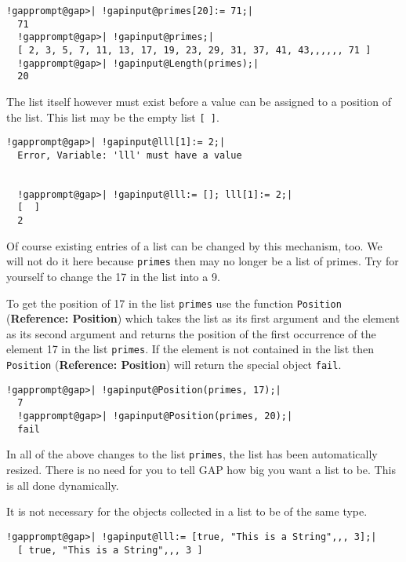 \documentclass[a4paper,11pt]{report}
\begin{document}
{{ 
\begin{Verbatim}[commandchars=!@|,fontsize=\small,frame=single,label=Example]
  !gapprompt@gap>| !gapinput@primes[20]:= 71;|
  71
  !gapprompt@gap>| !gapinput@primes;|
  [ 2, 3, 5, 7, 11, 13, 17, 19, 23, 29, 31, 37, 41, 43,,,,,, 71 ]
  !gapprompt@gap>| !gapinput@Length(primes);|
  20
\end{Verbatim}
 

 The list itself however must exist before a value can be assigned to a
position of the list. This list may be the empty list \texttt{[ ]}. 

 
\begin{Verbatim}[commandchars=!@|,fontsize=\small,frame=single,label=Example]
  !gapprompt@gap>| !gapinput@lll[1]:= 2;|
  Error, Variable: 'lll' must have a value
  
  
  !gapprompt@gap>| !gapinput@lll:= []; lll[1]:= 2;|
  [  ]
  2
\end{Verbatim}
 

 Of course existing entries of a list can be changed by this mechanism, too. We
will not do it here because \texttt{primes} then may no longer be a list of primes. Try for yourself to change the 17 in
the list into a 9. 

 To get the position of 17 in the list \texttt{primes} use the function \texttt{Position} (\textbf{Reference: Position}) which takes the list as its first argument and the element as its second
argument and returns the position of the first occurrence of the element 17 in
the list \texttt{primes}. If the element is not contained in the list then \texttt{Position} (\textbf{Reference: Position}) will return the special object \texttt{fail}. 

 
\begin{Verbatim}[commandchars=!@|,fontsize=\small,frame=single,label=Example]
  !gapprompt@gap>| !gapinput@Position(primes, 17);|
  7
  !gapprompt@gap>| !gapinput@Position(primes, 20);|
  fail
\end{Verbatim}
 

 In all of the above changes to the list \texttt{primes}, the list has been automatically resized. There is no need for you to tell \textsf{GAP} how big you want a list to be. This is all done dynamically. 

 It is not necessary for the objects collected in a list to be of the same
type. 

 
\begin{Verbatim}[commandchars=!@|,fontsize=\small,frame=single,label=Example]
  !gapprompt@gap>| !gapinput@lll:= [true, "This is a String",,, 3];|
  [ true, "This is a String",,, 3 ]
\end{Verbatim}
 

}}
\end{document}
